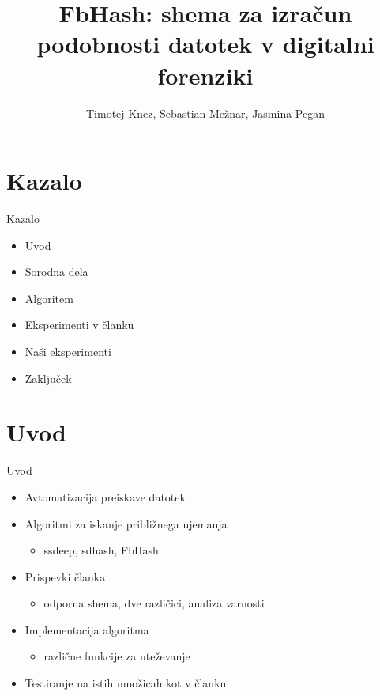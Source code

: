 \documentclass[xcolor=dvipsnames,compress]{beamer}
\title[FbHash]
{FbHash: shema za izra\v{c}un podobnosti datotek v digitalni forenziki}
\author[Knez, Mežnar, Pegan] %
{Timotej Knez\inst{1},  Sebastian Mežnar\inst{2}, Jasmina Pegan\inst{1}}
\institute[UL FRI, UL FMF] %
{
  \inst{1}%
  Fakulteta za računalništvo in informatiko\\
  Univerza v Ljubljana
  \and
  \inst{2}%
  Fakulteta za matematiko in fiziko\\
  Univerza v Ljubljana
}
\date[DigFor20] %
{}
\begin{document}
\begin{frame}
\titlepage
\end{frame}
\section{Kazalo}
\label{sec:kazalo}

\begin{frame}{Kazalo}
\begin{itemize}
  \item Uvod
  \item Sorodna dela
  \item Algoritem
  \item Eksperimenti v članku
  \item Naši eksperimenti
  \item Zaključek
\end{itemize}
\end{frame}


\section{Uvod}
\label{sec:uvod}

\begin{frame}{Uvod}
\begin{itemize}
	\item Avtomatizacija preiskave datotek
	\item Algoritmi za iskanje približnega ujemanja
	\begin{itemize}
		\item ssdeep, sdhash, FbHash
	\end{itemize}
	\item Prispevki članka
	\begin{itemize}
		\item odporna shema, dve različici, analiza varnosti
	\end{itemize}
	\item Implementacija algoritma
	\begin{itemize}
		\item različne funkcije za uteževanje
	\end{itemize}
	\item Testiranje na istih množicah kot v članku
\end{itemize}
\end{frame}
\end{document}
